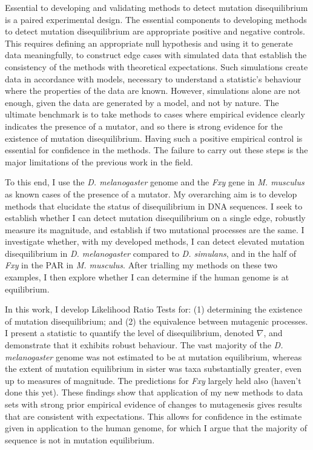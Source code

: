 Essential to developing and validating methods to detect mutation disequilibrium is a paired experimental design.
The essential components to developing methods to detect mutation disequilibrium are appropriate positive and negative controls. This requires defining an appropriate null hypothesis and using it to generate data meaningfully, to construct edge cases with simulated data that establish the consistency of the methods with theoretical expectations. Such simulations create data in accordance with models, necessary to understand a statistic's behaviour where the properties of the data are known. However, simulations alone are not enough, given the data are generated by a model, and not by nature. The ultimate benchmark is to take methods to cases where empirical evidence clearly indicates the presence of a mutator, and so there is strong evidence for the existence of mutation disequilibrium. Having such a positive empirical control is essential for confidence in the methods. The failure to carry out these steps is the major limitations of the previous work in the field. 

To this end, I use the \textit{D. melanogaster} genome and the \textit{Fxy} gene in \textit{M. musculus} as known cases of the presence of a mutator. My overarching aim is to develop methods that elucidate the status of disequilibrium in DNA sequences. I seek to establish whether I can detect mutation disequilibrium on a single edge, robustly measure its magnitude, and establish if two mutational processes are the same. I investigate whether, with my developed methods, I can detect elevated mutation disequilibrium in \textit{D. melanogaster} compared to \textit{D. simulans}, and in the half of \textit{Fxy} in the PAR in \textit{M. musculus}. After trialling my methods on these two examples, I then explore whether I can determine if the human genome is at equilibrium. 

In this work, I develop Likelihood Ratio Tests for: (1) determining the existence of mutation disequilibrium; and (2) the equivalence between mutagenic processes. I present a statistic to quantify the level of disequilibrium, denoted $\nabla$, and demonstrate that it exhibits robust behaviour. The vast majority of the \textit{D. melanogaster} genome was not estimated to be at mutation equilibrium, whereas the extent of mutation equilibrium in sister was taxa substantially greater, even up to measures of magnitude. The predictions for \textit{Fxy} largely held also (haven't done this yet). These findings show that application of my new methods to data sets with strong prior empirical evidence of changes to mutagenesis gives results that are consistent with expectations. This allows for confidence in the estimate given in application to the human genome, for which I argue that the majority of sequence is not in mutation equilibrium. 